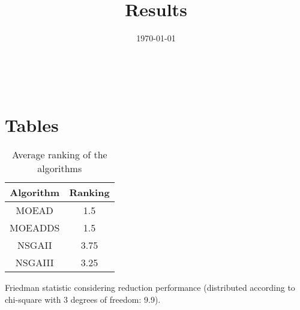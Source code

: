 \documentclass{article}
\title{Results}
\author{}
\date{\today}
\begin{document}
\oddsidemargin 0in \topmargin 0in\maketitle
\
\section{Tables}
\begin{table}[!htp]
\centering
\caption{Average ranking of the algorithms}
\begin{tabular}{c|c}
Algorithm&Ranking\\
\hline
MOEAD&1.5\\
MOEADDS&1.5\\
NSGAII&3.75\\
NSGAIII&3.25\\
\end{tabular}
\end{table}


Friedman statistic considering reduction performance (distributed according to chi-square with 3 degrees of freedom: 9.9).
\end{document}
